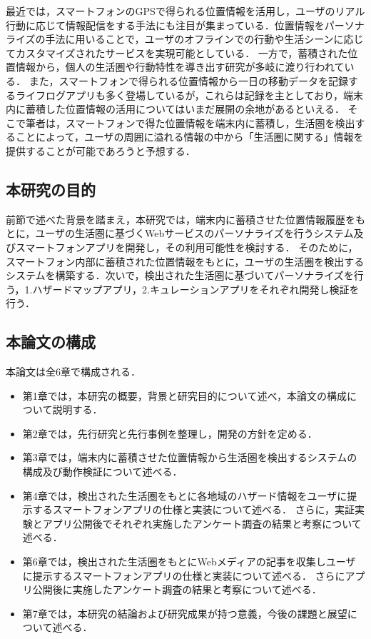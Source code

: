 \documentclass[a4paper]{jsarticle}
\begin{document}
最近では，スマートフォンのGPSで得られる位置情報を活用し，ユーザのリアル行動に応じて情報配信をする手法にも注目が集まっている．位置情報をパーソナライズの手法に用いることで，ユーザのオフラインでの行動や生活シーンに応じてカスタマイズされたサービスを実現可能としている\cite{tameco}\cite{bitblend}．
一方で，蓄積された位置情報から，個人の生活圏や行動特性を導き出す研究が多岐に渡り行われている\cite{matsuo}\cite{docomo}．
また，スマートフォンで得られる位置情報から一日の移動データを記録するライフログアプリも多く登場しているが，これらは記録を主としており，端末内に蓄積した位置情報の活用についてはいまだ展開の余地があるといえる．
そこで筆者は，スマートフォンで得た位置情報を端末内に蓄積し，生活圏を検出することによって，ユーザの周囲に溢れる情報の中から「生活圏に関する」情報を提供することが可能であろうと予想する．


\subsection{本研究の目的}
前節で述べた背景を踏まえ，本研究では，端末内に蓄積させた位置情報履歴をもとに，ユーザの生活圏に基づくWebサービスのパーソナライズを行うシステム及びスマートフォンアプリを開発し，その利用可能性を検討する．
そのために，スマートフォン内部に蓄積された位置情報をもとに，ユーザの生活圏を検出するシステムを構築する．次いで，検出された生活圏に基づいてパーソナライズを行う，1.ハザードマップアプリ，2.キュレーションアプリをそれぞれ開発し検証を行う．

\subsection{本論文の構成}
本論文は全6章で構成される．
\begin{itemize}
  \item
第1章では，本研究の概要，背景と研究目的について述べ，本論文の構成について説明する．
  \item
第2章では，先行研究と先行事例を整理し，開発の方針を定める．
  \item
第3章では，端末内に蓄積させた位置情報から生活圏を検出するシステムの構成及び動作検証について述べる．
  \item
第4章では，検出された生活圏をもとに各地域のハザード情報をユーザに提示するスマートフォンアプリの仕様と実装について述べる．
さらに，実証実験とアプリ公開後でそれぞれ実施したアンケート調査の結果と考察について述べる．
  \item
第6章では，検出された生活圏をもとにWebメディアの記事を収集しユーザに提示するスマートフォンアプリの仕様と実装について述べる．
さらにアプリ公開後に実施したアンケート調査の結果と考察について述べる．
  \item
第7章では，本研究の結論および研究成果が持つ意義，今後の課題と展望について述べる．
\end{itemize}
\end{document}
